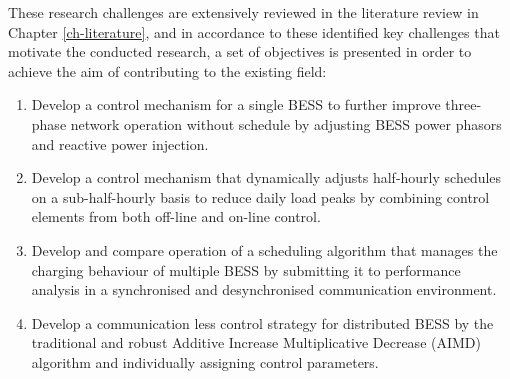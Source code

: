 These research challenges are extensively reviewed in the literature review in Chapter \ref{ch-literature}, and in accordance to these identified key challenges that motivate the conducted research, a set of objectives is presented in order to achieve the aim of contributing to the existing field:

\begin{enumerate}[
labelindent=*,
style=multiline,
leftmargin=*,
label=\textbf{Objective~\arabic*}
]
	\item \label{objective-1} Develop a control mechanism for a single BESS to further improve three-phase network operation without  schedule by adjusting BESS power phasors and reactive power injection.
	\item \label{objective-2} Develop a control mechanism that dynamically adjusts half-hourly schedules on a sub-half-hourly basis to reduce daily load peaks by combining control elements from both off-line and on-line control.
	\item \label{objective-3} Develop and compare operation of a scheduling algorithm that manages the charging behaviour of multiple BESS by submitting it to performance analysis in a synchronised and desynchronised communication environment.
	\item \label{objective-4} Develop a communication less control strategy for distributed BESS by  the traditional and robust Additive Increase Multiplicative Decrease (AIMD) algorithm and individually assigning control parameters.
\end{enumerate}

